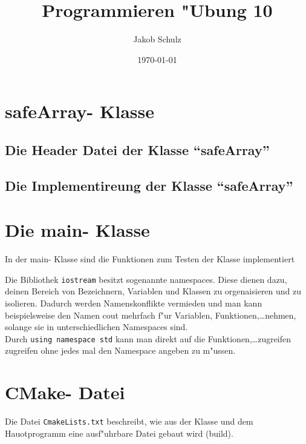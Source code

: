 \documentclass[a4paper,11pt,titlepage]{article}
\begin{document}
\title{Programmieren "Ubung 10}


\author{Jakob Schulz}


\date{\today}

\maketitle{\thispagestyle{plain}}

\section{safeArray- Klasse}
\subsection{Die Header Datei der Klasse "`safeArray"'}

\subsection{Die Implementireung der Klasse "`safeArray"'}

\newpage
\section{Die main- Klasse}
In der main- Klasse sind die Funktionen zum Testen der Klasse implementiert

Die Bibliothek \verb+iostream+ besitzt sogenannte namespaces. Diese dienen dazu, deinen Bereich von Bezeichnern, Variablen und Klassen zu orgenaisieren und zu isolieren. Dadurch werden Namenskonflikte vermieden und man kann beispielsweise den Namen cout mehrfach f"ur Variablen, Funktionen,\dots nehmen, solange sie in unterschiedlichen Namespaces sind.\\
Durch \verb+using namespace std+ kann man direkt auf die Funktionen,\dots zugreifen zugreifen ohne jedes mal den Namespace angeben zu m"ussen.
\section{CMake- Datei}
Die Datei \verb+CmakeLists.txt+ beschreibt, wie aus der Klasse und dem Hauotprogramm eine ausf"uhrbare Datei gebaut wird (build).

\end{document}
